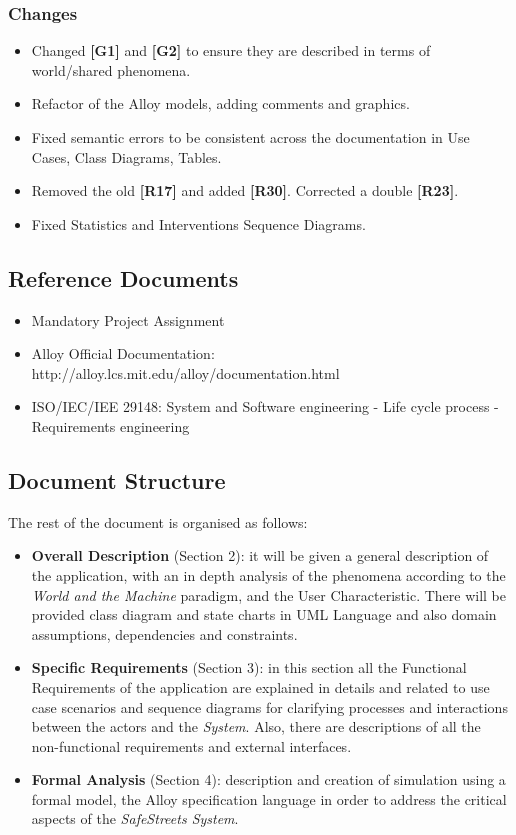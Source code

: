 \documentclass {article}
\begin{document}
		\subsubsection{Changes}
		\begin{itemize}
			\item Changed {\bf[G1]} and {\bf[G2]} to ensure they are described in terms of world/shared phenomena.
			\item Refactor of the Alloy models, adding comments and graphics.
			\item Fixed semantic errors to be consistent across the documentation in Use Cases, Class Diagrams, Tables.
			\item Removed the old {\bf[R17]} and added {\bf [R30]}. Corrected a double {\bf [R23]}.
			\item Fixed Statistics and Interventions Sequence Diagrams. 
		\end{itemize}
	
		\subsection{Reference Documents}
		
		\begin{itemize}
			 \item Mandatory Project Assignment
			 \item Alloy Official Documentation: http://alloy.lcs.mit.edu/alloy/documentation.html
			 \item ISO/IEC/IEE 29148: System and Software engineering - Life cycle process - Requirements engineering
		\end{itemize}
\pagebreak
	\subsection{Document Structure}
			The rest of the document is organised as follows:
				\begin{itemize}
					\item {\bf Overall Description} (Section 2): it will be given a general description of the application, with an in depth analysis of the phenomena according to the {\it World and the Machine} paradigm, and the User Characteristic. There will be provided class diagram and state charts in UML Language and also domain assumptions, dependencies and constraints.
					\item {\bf Specific Requirements} (Section 3): in this section all the Functional Requirements of the application are explained in details and related to use case scenarios and sequence diagrams for clarifying processes and interactions between the actors and the {\it System}. Also, there are descriptions of all the non-functional requirements and external interfaces.
					\item {\bf Formal Analysis} (Section 4): description and creation of simulation using a formal model, the Alloy specification language in order to address the critical aspects of the {\it SafeStreets System}.				
					\end{itemize}
\end{document}
